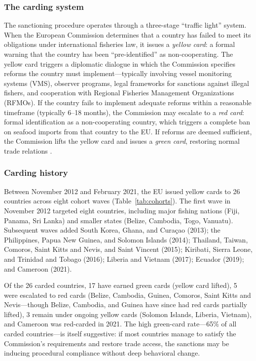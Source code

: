 \documentclass[12pt]{article}
\begin{document}
\subsubsection*{The carding system} The sanctioning procedure operates through a three-stage ``traffic light'' system. When the European Commission determines that a country has failed to meet its obligations under international fisheries law, it issues a \textit{yellow card}: a formal warning that the country has been ``pre-identified'' as non-cooperating. The yellow card triggers a diplomatic dialogue in which the Commission specifies reforms the country must implement---typically involving vessel monitoring systems (VMS), observer programs, legal frameworks for sanctions against illegal fishers, and cooperation with Regional Fisheries Management Organizations (RFMOs). If the country fails to implement adequate reforms within a reasonable timeframe (typically 6--18 months), the Commission may escalate to a \textit{red card}: formal identification as a non-cooperating country, which triggers a complete ban on seafood imports from that country to the EU. If reforms are deemed sufficient, the Commission lifts the yellow card and issues a \textit{green card}, restoring normal trade relations \citep{fernandes2011does}.

\subsubsection*{Carding history} Between November 2012 and February 2021, the EU issued yellow cards to 26 countries across eight cohort waves (Table~\ref{tab:cohorts}). The first wave in November 2012 targeted eight countries, including major fishing nations (Fiji, Panama, Sri Lanka) and smaller states (Belize, Cambodia, Togo, Vanuatu). Subsequent waves added South Korea, Ghana, and Cura\c{c}ao (2013); the Philippines, Papua New Guinea, and Solomon Islands (2014); Thailand, Taiwan, Comoros, Saint Kitts and Nevis, and Saint Vincent (2015); Kiribati, Sierra Leone, and Trinidad and Tobago (2016); Liberia and Vietnam (2017); Ecuador (2019); and Cameroon (2021).

Of the 26 carded countries, 17 have earned green cards (yellow card lifted), 5 were escalated to red cards (Belize, Cambodia, Guinea, Comoros, Saint Kitts and Nevis---though Belize, Cambodia, and Guinea have since had red cards partially lifted), 3 remain under ongoing yellow cards (Solomon Islands, Liberia, Vietnam), and Cameroon was red-carded in 2021. The high green-card rate---65\% of all carded countries---is itself suggestive: if most countries manage to satisfy the Commission's requirements and restore trade access, the sanctions may be inducing procedural compliance without deep behavioral change.
\end{document}
